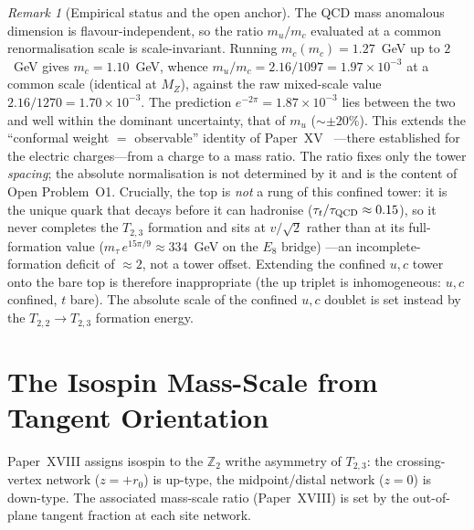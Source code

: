 \documentclass[11pt,a4paper]{article}
\theoremstyle{definition}\newtheorem{definition}[theorem]{Definition}
\theoremstyle{remark}
\newtheorem{remark}[theorem]{Remark}
\newcommand{\Ztwo}{\mathbb{Z}_2}
\begin{document}
\begin{remark}[Empirical status and the open anchor]
\label{P20:rem:up_ratio_data}
The QCD mass anomalous dimension is flavour-independent, so the ratio
$m_u/m_c$ evaluated at a common renormalisation scale is scale-invariant.
Running $m_c(m_c)=1.27$~GeV up to $2$~GeV gives $m_c=1.10$~GeV, whence
$m_u/m_c=2.16/1097=1.97\times10^{-3}$ at a common scale (identical at $M_Z$),
against the raw mixed-scale value $2.16/1270=1.70\times10^{-3}$. The
prediction $e^{-2\pi}=1.87\times10^{-3}$ lies between the two and well within
the dominant uncertainty, that of $m_u$ ($\sim\pm20\%$). This extends the
``conformal weight $=$ observable'' identity of Paper~XV~\cite{Paper15}
---there established for the electric charges---from a charge to a mass ratio.
The ratio fixes only the tower \emph{spacing}; the absolute normalisation is
not determined by it and is the content of Open Problem~O1. Crucially, the top
is \emph{not} a rung of this confined tower: it is the unique quark that decays
before it can hadronise ($\tau_t/\tau_{\rm QCD}\approx0.15$), so it never
completes the $T_{2,3}$ formation and sits at $v/\sqrt2$ rather than at its
full-formation value ($m_\tau\,e^{15\pi/9}\approx334$~GeV on the $E_8$ bridge)
---an incomplete-formation deficit of $\approx2$, not a tower offset.
Extending the confined
$u,c$ tower onto the bare top is therefore inappropriate (the up triplet is
inhomogeneous: $u,c$ confined, $t$ bare). The absolute scale of the confined
$u,c$ doublet is set instead by the $T_{2,2}\!\to\!T_{2,3}$ formation energy.
\end{remark}

\section{The Isospin Mass-Scale from Tangent Orientation}
\label{P20:sec:isospin}

Paper~XVIII assigns isospin to the $\Ztwo$ writhe asymmetry of $T_{2,3}$:
the crossing-vertex network ($z=+r_0$) is up-type, the midpoint/distal
network ($z=0$) is down-type. %
The associated mass-scale ratio (Paper~XVIII) is set by the out-of-plane
tangent fraction at each site network.
\end{document}
